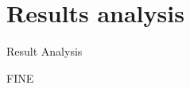 \documentclass[12pt]{beamer}
\begin{document}
  \section{Results analysis}
  \begin{frame}[fragile]{Result Analysis}
  \end{frame}

  \begin{frame}[standout]
  	FINE
  \end{frame}
\end{document}
